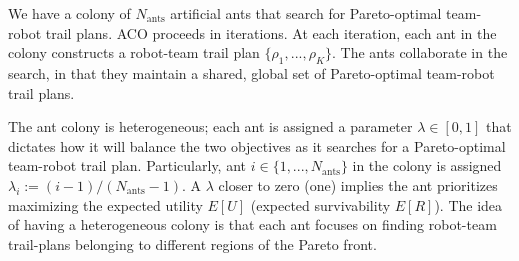 \documentclass[11pt, oneside]{article}
\begin{document}
We have a colony of $N_{\text{ants}}$ artificial ants that search for Pareto-optimal team-robot trail plans. 
ACO proceeds in iterations. 
At each iteration, each ant in the colony constructs a robot-team trail plan $\{\rho_1, ..., \rho_K\}$. 
The ants collaborate in the search, in that they maintain a shared, global set of Pareto-optimal team-robot trail plans.

The ant colony is heterogeneous; each ant is assigned a parameter $\lambda \in [0, 1]$ that dictates how it will balance the two objectives as it searches for a Pareto-optimal team-robot trail plan. Particularly, ant $i\in\{1, ..., N_{\text{ants}}\}$ in the colony is assigned $\lambda_i := (i-1) / (N_{\text{ants}}-1)$. A $\lambda$ closer to zero (one) implies the ant prioritizes maximizing the expected utility $E[U]$ (expected survivability $E[R]$). The idea of having a heterogeneous colony is that each ant focuses on finding robot-team trail-plans belonging to different regions of the Pareto front. 
\end{document}
